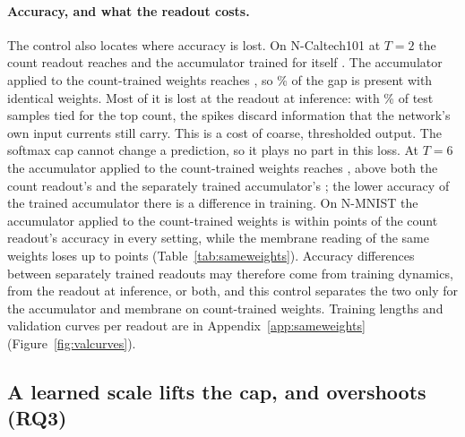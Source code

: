 \documentclass[10pt]{article}
\begin{document}
\paragraph{Accuracy, and what the readout costs.} The control also locates where accuracy is
lost. On N-Caltech101 at $T=2$ the count readout reaches \swNcTwoCountAcc{} and the accumulator %
trained for itself \swNcTwoTrainedAcc. The accumulator applied to the count-trained weights %
reaches \swNcTwoAccumAcc, so \swNcTwoShare\% of the gap is present with identical weights. %
Most of it is lost at the readout at inference: with \tieNcTwo\% of test samples tied %
for the top count, the spikes discard information that the network's own input currents still
carry. This is a cost of coarse, thresholded output. The softmax cap cannot change a prediction,
so it plays no part in this loss. At $T=6$ the accumulator applied to the count-trained weights reaches %
\swNcSixAccumAcc, above both the count readout's \swNcSixCountAcc{} and the separately trained %
accumulator's \swNcSixTrainedAcc; the lower accuracy of the trained accumulator there is a
difference in training. On N-MNIST the accumulator applied to the count-trained weights is %
within \swNmMaxDiff{} points of the count readout's accuracy in every setting, while the membrane
reading of the same weights loses up to \swNmMemMaxDiff{} points (Table~\ref{tab:sameweights}). Accuracy differences between separately trained readouts may therefore come
from training dynamics, from the readout at inference, or both, and this control separates the two
only for the accumulator and membrane on count-trained weights. Training lengths and validation
curves per readout are in Appendix~\ref{app:sameweights} (Figure~\ref{fig:valcurves}).

\subsection{A learned scale lifts the cap, and overshoots (RQ3)}
\label{sec:scale}
\end{document}
